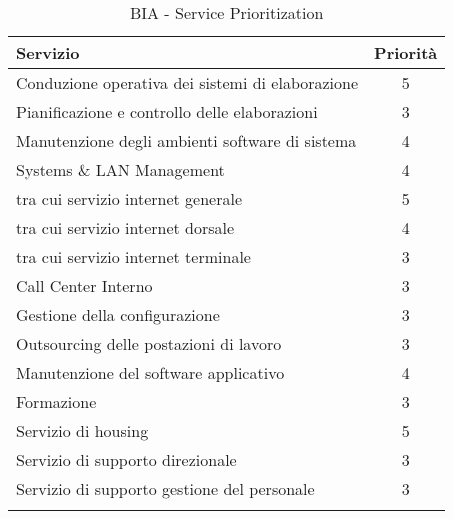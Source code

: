 \renewcommand\arraystretch{1,3}
\begin{longtable}{p{10cm} c}
\toprule
\textbf{Servizio} & \textbf{Priorità} \\
\toprule
Conduzione operativa dei sistemi di elaborazione & 5 \\
Pianificazione e controllo delle elaborazioni & 3 \\
Manutenzione degli ambienti software di sistema & 4 \\
Systems \& LAN Management & 4 \\
\hspace{2cm} tra cui servizio internet generale & 5 \\
\hspace{2cm} tra cui servizio internet dorsale & 4 \\
\hspace{2cm} tra cui servizio internet terminale & 3 \\
Call Center Interno & 3 \\
Gestione della configurazione & 3 \\
Outsourcing delle postazioni di lavoro & 3 \\
Manutenzione del software applicativo & 4 \\
Formazione & 3 \\
Servizio di housing & 5 \\
Servizio di supporto direzionale & 3 \\
Servizio di supporto gestione del personale & 3 \\
\bottomrule
\caption{BIA - Service Prioritization}
\end{longtable}

\newpage
